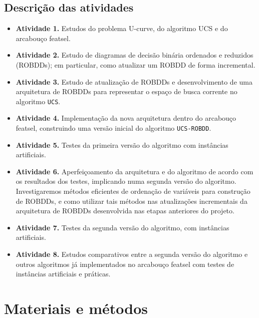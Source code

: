\documentclass[12pt]{article}
\begin{document}
\subsection{Descrição das atividades} \label{sec:atividades}

\begin{itemize}

  \item[] {\bf Atividade 1.} Estudos do problema U-curve, do algoritmo UCS e do arcabouço featsel.

  \item[] {\bf Atividade 2.} Estudo de diagramas de decisão binária ordenados e reduzidos (ROBDDs); em particular, como atualizar um ROBDD de forma incremental.

  \item[] {\bf Atividade 3.} Estudo de atualização de ROBDDs e desenvolvimento de uma arquitetura de ROBDDs para representar o espaço de busca corrente no algoritmo {\tt UCS}.

  \item[] {\bf Atividade 4.} Implementação da nova arquitetura dentro do arcabouço featsel, construindo uma versão inicial do algoritmo {\tt UCS-ROBDD}.

  \item[] {\bf Atividade 5.} Testes da primeira versão do algoritmo com instâncias artificiais.

  \item[] {\bf Atividade 6.} Aperfeiçoamento da arquitetura e do algoritmo de acordo com os resultados dos testes, implicando numa segunda versão do algoritmo. Investigaremos métodos eficientes de ordenação de variáveis para construção de ROBDDs, e como utilizar tais métodos nas atualizações incrementais da arquitetura de ROBDDs desenvolvida nas etapas anteriores do projeto.

  \item[] {\bf Atividade 7.} Testes da segunda versão do algoritmo, com instâncias artificiais.

  \item[] {\bf Atividade 8.} Estudos comparativos entre a segunda versão do algoritmo e outros algoritmos já implementados no arcabouço featsel com testes de instâncias artificiais e práticas.

\end{itemize}

\section{Materiais e métodos}
\end{document}

